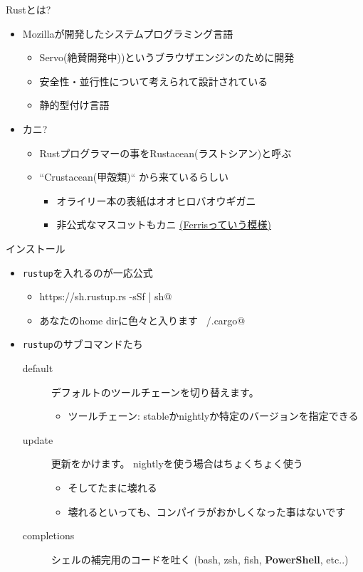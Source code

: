 \documentclass[cjk,dvipdfmx,10pt,compress,t,fragile%
hyperref={bookmarks=true,bookmarksnumbered=true,bookmarksopen=false,%
colorlinks=false,%
pdftitle={第 134 回 関西 Debian 勉強会},%
pdfauthor={小林},%
pdfsubject={資料},%
}]{beamer}
\begin{document}
\begin{frame}[fragile]{Rustとは?}
 \begin{itemize}
  \item Mozillaが開発したシステムプログラミング言語
	\begin{itemize}
	 \item Servo(絶賛開発中))というブラウザエンジンのために開発
	 \item 安全性・並行性について考えられて設計されている
	 \item 静的型付け言語
	\end{itemize}
  \item カニ?
	\begin{itemize}
	 \item Rustプログラマーの事をRustacean(ラストシアン)と呼ぶ
	 \item ``Crustacean(甲殻類)`` から来ているらしい
	       \begin{itemize}
		\item オライリー本の表紙はオオヒロバオウギガニ
		\item 非公式なマスコットもカニ \href{http://rustacean.net/}{(Ferrisっていう模様)}
	       \end{itemize}
	\end{itemize}
 \end{itemize}
\end{frame}

\begin{frame}[fragile]{インストール}
 \begin{itemize}
  \item \texttt{rustup}を入れるのが一応公式
	\begin{itemize}
	 \item \verb@curl https://sh.rustup.rs -sSf | sh@
	 \item あなたのhome dirに色々と入ります \verb@~/.cargo@
	\end{itemize}
  \item \texttt{rustup}のサブコマンドたち
	\begin{description}
	 \item[default] デフォルトのツールチェーンを切り替えます。
		    \begin{itemize}
		     \item ツールチェーン: stableかnightlyか特定のバージョンを指定できる
		    \end{itemize}
	 \item[update] 更新をかけます。
		    nightlyを使う場合はちょくちょく使う
		    \begin{itemize}
		     \item そしてたまに壊れる
		     \item 壊れるといっても、コンパイラがおかしくなった事はないです
		    \end{itemize}
	 \item[completions] シェルの補完用のコードを吐く (bash, zsh, fish, \textbf{PowerShell}, etc..)
	\end{description}
 \end{itemize}
\end{frame}
\end{document}
